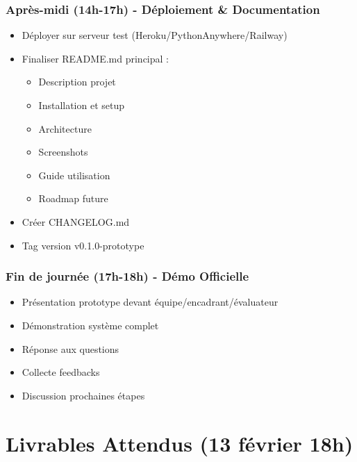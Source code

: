 \documentclass[11pt,a4paper]{article}
\begin{document}
\subsubsection{Après-midi (14h-17h) - Déploiement \& Documentation}

\begin{itemize}
    \item[$\square$] Déployer sur serveur test (Heroku/PythonAnywhere/Railway)
    \item[$\square$] Finaliser README.md principal :
    \begin{itemize}
        \item Description projet
        \item Installation et setup
        \item Architecture
        \item Screenshots
        \item Guide utilisation
        \item Roadmap future
    \end{itemize}
    \item[$\square$] Créer CHANGELOG.md
    \item[$\square$] Tag version v0.1.0-prototype
\end{itemize}

\subsubsection{Fin de journée (17h-18h) - Démo Officielle}

\begin{important}
\begin{itemize}
    \item Présentation prototype devant équipe/encadrant/évaluateur
    \item Démonstration système complet
    \item Réponse aux questions
    \item Collecte feedbacks
    \item Discussion prochaines étapes
\end{itemize}
\end{important}

\clearpage

\section{Livrables Attendus (13 février 18h)}
\label{sec:livrables}
\end{document}
